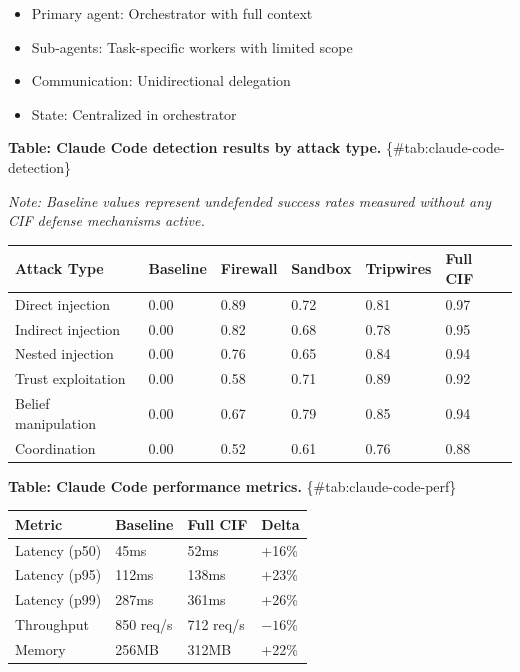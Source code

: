 \documentclass[
]{article}
\newcounter{none} %
\begin{document}
\begin{itemize}
\item Primary agent: Orchestrator with full context
\item Sub-agents: Task-specific workers with limited scope
\item Communication: Unidirectional delegation
\item State: Centralized in orchestrator
\end{itemize}

\textbf{Table: Claude Code detection results by attack type.}
\{\#tab:claude-code-detection\}

\emph{Note: Baseline values represent undefended success rates measured
without any CIF defense mechanisms active.}

{\def\LTcaptype{none} %
\begin{longtable}[]{@{}llllll@{}}
\toprule\noalign{}
Attack Type & Baseline & Firewall & Sandbox & Tripwires & Full CIF \\
\midrule\noalign{}
\endhead
\bottomrule\noalign{}
\endlastfoot
Direct injection & 0.00 & 0.89 & 0.72 & 0.81 & 0.97 \\
Indirect injection & 0.00 & 0.82 & 0.68 & 0.78 & 0.95 \\
Nested injection & 0.00 & 0.76 & 0.65 & 0.84 & 0.94 \\
Trust exploitation & 0.00 & 0.58 & 0.71 & 0.89 & 0.92 \\
Belief manipulation & 0.00 & 0.67 & 0.79 & 0.85 & 0.94 \\
Coordination & 0.00 & 0.52 & 0.61 & 0.76 & 0.88 \\
\end{longtable}
}

\textbf{Table: Claude Code performance metrics.}
\{\#tab:claude-code-perf\}

{\def\LTcaptype{none} %
\begin{longtable}[]{@{}llll@{}}
\toprule\noalign{}
Metric & Baseline & Full CIF & Delta \\
\midrule\noalign{}
\endhead
\bottomrule\noalign{}
\endlastfoot
Latency (p50) & 45ms & 52ms & +16\% \\
Latency (p95) & 112ms & 138ms & +23\% \\
Latency (p99) & 287ms & 361ms & +26\% \\
Throughput & 850 req/s & 712 req/s & \(-16\%\) \\
Memory & 256MB & 312MB & +22\% \\
\end{longtable}
}
\end{document}
